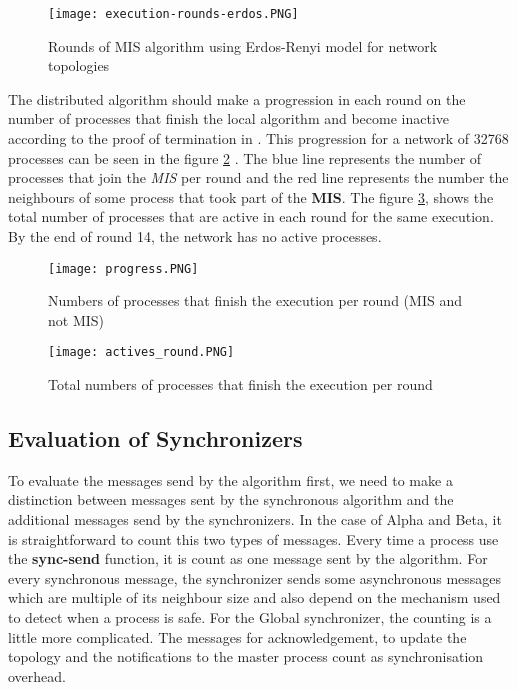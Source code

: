 \begin{figure}[ht]
\centering
\texttt{[image: execution-rounds-erdos.PNG]} 
\caption{Rounds of MIS algorithm using Erdos-Renyi model for network topologies}
\label{fig:rounds-erdos}
\end{figure}


The distributed algorithm should make a progression in each round on the number of processes that finish the local algorithm and become inactive according to the proof of termination in \cite{yves2009optimal}. This progression for a network of 32768 processes can be seen in the figure \ref{fig:progression} . The blue line represents the number of processes that join the \textit{MIS}  per round and the red line represents the number the neighbours of some process that took part of the \textbf{MIS}. The figure \ref{fig:actives}, shows the total number of processes that are active in each round for the same execution. By the end of round 14, the network has no active processes.  

\begin{figure}[ht]
\centering
\texttt{[image: progress.PNG]} 
\caption{Numbers of processes that finish the execution per round (MIS and not MIS)}
\label{fig:progression}
\end{figure}

\begin{figure}[ht]
\centering
\texttt{[image: actives\_round.PNG]} 
\caption{Total numbers of processes that finish the execution per round}
\label{fig:actives}
\end{figure}


\subsection{Evaluation of Synchronizers}

To evaluate the messages send by the algorithm first, we need to make a distinction between messages sent by the synchronous algorithm and the additional messages send by the synchronizers. In the case of Alpha and Beta, it is straightforward to count this two types of messages. Every time a process use the \textbf{sync-send} function, it is count as one message sent by the algorithm. For every synchronous message, the synchronizer sends some asynchronous messages which are multiple of its neighbour size and also depend on the mechanism used to detect when a process is safe. For the Global synchronizer, the counting is a little more complicated. The messages for acknowledgement, to update the topology and the notifications to the master process count as synchronisation overhead.



